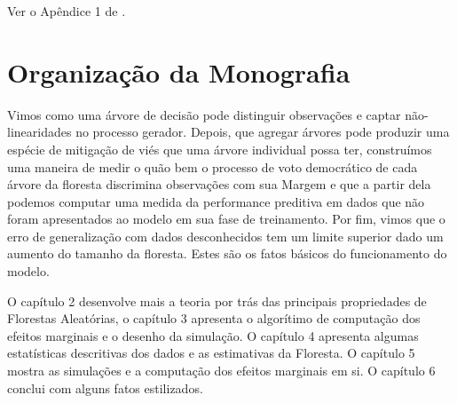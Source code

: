  \begin{prova}
 Ver o Apêndice 1 de \cite{breiman2001random}. \blacksquare
 \end{prova}
 
 \section{Organização da Monografia}
 
 Vimos como uma árvore de decisão pode distinguir observações e captar não-linearidades no processo gerador. Depois, que agregar árvores pode produzir uma espécie de mitigação de viés que uma árvore individual possa ter, construímos uma maneira de medir o quão bem o processo de voto democrático de cada árvore da floresta discrimina observações com sua Margem e que a partir dela podemos computar uma medida da performance preditiva em dados que não foram apresentados ao modelo em sua fase de treinamento. Por fim, vimos que o erro de generalização com dados desconhecidos tem um limite superior dado um aumento do tamanho da floresta. Estes são os fatos básicos do funcionamento do modelo.
 
 O capítulo 2 desenvolve mais a teoria por trás das principais propriedades de Florestas Aleatórias, o capítulo 3 apresenta o algorítimo de computação dos efeitos marginais e o desenho da simulação. O capítulo 4 apresenta algumas estatísticas descritivas dos dados e as estimativas da Floresta. O capítulo 5 mostra as simulações e a computação dos efeitos marginais em si. O capítulo 6 conclui com alguns fatos estilizados.


